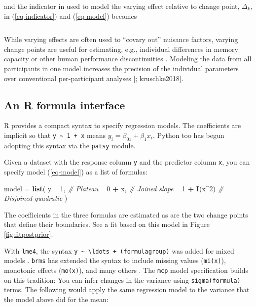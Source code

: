 \documentclass[
  american,
]{article}
\newenvironment{Shaded}{\begin{snugshade}}{\end{snugshade}}
\newcommand{\CommentTok}[1]{\textcolor[rgb]{0.56,0.35,0.01}{\textit{#1}}}
\newcommand{\DecValTok}[1]{\textcolor[rgb]{0.00,0.00,0.81}{#1}}
\newcommand{\KeywordTok}[1]{\textcolor[rgb]{0.13,0.29,0.53}{\textbf{#1}}}
\newcommand{\NormalTok}[1]{#1}
\newcommand{\OperatorTok}[1]{\textcolor[rgb]{0.81,0.36,0.00}{\textbf{#1}}}
\newcommand{\StringTok}[1]{\textcolor[rgb]{0.31,0.60,0.02}{#1}}
\begin{document}
and the indicator in used to model the varying effect relative to change point, \(\Delta_k\), in (\ref{eq-indicator}) and (\ref{eq-model}) becomes

\begin{equation}
[x_i > \delta_{k, j}]
\end{equation}

While varying effects are often used to ``covary out'' nuisance factors, varying change points are useful for estimating, e.g., individual differences in memory capacity or other human performance discontinuities \citep{lindelov2018}. Modeling the data from all participants in one model increases the precision of the individual parameters over conventional per-participant analyses {[}\citet{leibovich-raveh2018}; kruschke2018{]}.

\hypertarget{segments_api}{%
\subsection{An R formula interface}\label{segments_api}}

R \citep{rcoreteam2019} provides a compact syntax to specify regression models. The coefficients are implicit so that \texttt{y\ \textasciitilde{}\ 1\ +\ x} means \(y_i = \beta_01 + \beta_1x_i\). Python too has begun adopting this syntax via the \texttt{patsy} module.

Given a dataset with the response column \texttt{y} and the predictor column \texttt{x}, you can specify model (\ref{eq-model}) as a list of formulas:

\begin{Shaded}
\begin{Highlighting}[]
\NormalTok{model =}\StringTok{ }\KeywordTok{list}\NormalTok{(}
\NormalTok{  y }\OperatorTok{~}\StringTok{ }\DecValTok{1}\NormalTok{,          }\CommentTok{# Plateau}
    \OperatorTok{~}\StringTok{ }\DecValTok{0} \OperatorTok{+}\StringTok{ }\NormalTok{x,      }\CommentTok{# Joined slope}
    \OperatorTok{~}\StringTok{ }\DecValTok{1} \OperatorTok{+}\StringTok{ }\KeywordTok{I}\NormalTok{(x}\OperatorTok{^}\DecValTok{2}\NormalTok{)  }\CommentTok{# Disjoined quadratic}
\NormalTok{)}
\end{Highlighting}
\end{Shaded}

The coefficients in the three formulas are estimated as are the two change points that define their boundaries. See a fit based on this model in Figure \ref{fig:fitpostprior}.

With \texttt{lme4}, the syntax \texttt{y\ \textasciitilde{}\ \textbackslash{}ldots\ +\ (formula\textbar{}group)} was added for mixed models \citep{bates2015}. \texttt{brms} has extended the syntax to include missing values (\texttt{mi(x)}), monotonic effects (\texttt{mo(x)}), and many others \citep{burkner2017}. The \texttt{mcp} model specification builds on this tradition: You can infer changes in the variance using \texttt{sigma(formula)} terms. The following would apply the same regression model to the variance that the model above did for the mean:
\end{document}
